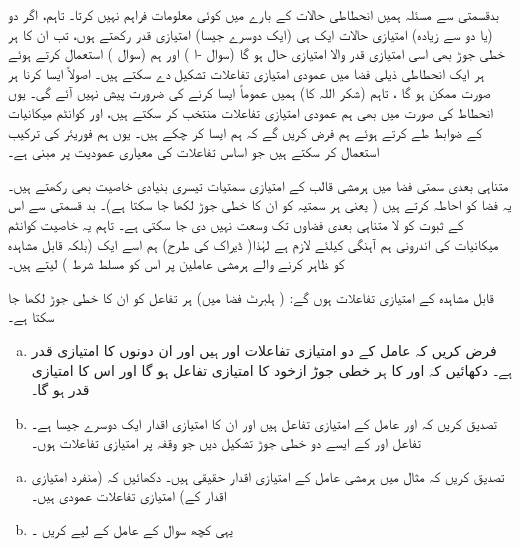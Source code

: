  بدقسمتی سے مسئلہ  ہمیں انحطاطی حالات  کے بارے میں کوئی معلومات فراہم نہیں کرتا۔ تاہم، اگر دو (یا دو سے زیادہ) امتیازی حالات ایک ہی (ایک دوسرے جیسا) امتیازی قدر رکھتے ہوں، تب ان کا ہر خطی جوڑ بھی اسی امتیازی قدر والا امتیازی حال ہو گا (سوال -ا ) اور ہم  (سوال ) استعمال کرتے ہوئے ہر ایک انحطاطی ذیلی فضا میں عمودی امتیازی تفاعلات تشکیل دے سکتے ہیں۔ اصولاً  ایسا کرنا ہر صورت ممکن ہو گا ، تاہم (شکر اللہ کا) ہمیں عموماً ایسا کرنے کی ضرورت پیش نہیں آئے گی۔ یوں انحطاط کی صورت میں بھی ہم عمودی امتیازی تفاعلات منتخب کر سکتے ہیں، اور کوانٹم میکانیات کے ضوابط طے کرتے ہوئے ہم فرض کریں گے کہ ہم ایسا کر چکے ہیں۔ یوں ہم فوریئر کی ترکیب استعمال کر سکتے ہیں جو اساس تفاعلات کی معیاری عمودیت پر مبنی ہے۔
 
 متناہی بعدی سمتی فضا میں ہرمشی قالب کے امتیازی سمتیات تیسری بنیادی خاصیت بھی رکھتے ہیں۔ یہ فضا کو احاطہ کرتے ہیں ( یعنی ہر سمتیہ کو ان کا خطی جوڑ لکھا جا سکتا ہے)۔ بد قسمتی سے اس کے ثبوت کو لا متناہی بعدی فضاوں تک وسعت نہیں دی جا سکتی ہے۔ تاہم یہ خاصیت کوانٹم میکانیات کی اندرونی ہم آہنگی کیلئے لازم ہے لہٰذا( ڈیراک کی طرح) ہم اسے ایک  (بلکہ قابل مشاہدہ کو ظاہر کرنے والے ہرمشی عاملین پر اس کو مسلط شرط ) لیتے ہیں۔
 
 قابل مشاہدہ کے امتیازی تفاعلات  ہوں گے: ( ہلبرٹ فضا میں) ہر تفاعل کو ان کا خطی جوڑ لکھا جا سکتا ہے۔ 

\begin{enumerate}[a.]
\item
 فرض کریں کہ عامل  کے دو امتیازی تفاعلات  اور  ہیں اور ان دونوں کا امتیازی قدر  ہے۔ دکھائیں کہ  اور  کا ہر خطی جوڑ ازخود  کا امتیازی تفاعل ہو گا اور اس کا امتیازی قدر  ہو گا۔
\item
 تصدیق کریں کہ  اور  عامل  کے امتیازی تفاعل ہیں اور ان کا امتیازی اقدار ایک دوسرے جیسا ہے۔تفاعل  اور  کے ایسے دو خطی جوڑ تشکیل دیں جو وقفہ  پر  امتیازی تفاعلات ہوں۔
\end{enumerate}
\begin{enumerate}[a.]
\item
 تصدیق کریں کہ مثال  میں ہرمشی عامل کے امتیازی اقدار حقیقی ہیں۔ دکھائیں کہ (منفرد امتیازی اقدار کے) امتیازی تفاعلات عمودی ہیں۔ 
\item
 یہی کچھ سوال  کے عامل کے لیے کریں ۔
\end{enumerate}


